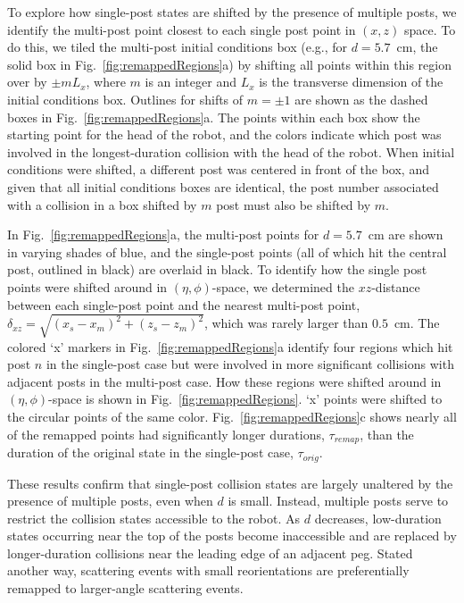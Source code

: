 \documentclass[aps,pre,twocolumn,superscriptaddress]{revtex4-1}
\begin{document}
To explore how single-post states are shifted by the presence of multiple posts, we identify the multi-post point closest to each single post point in $(x,z)$ space. To do this, we tiled the multi-post initial conditions box (e.g., for $d = 5.7$~cm, the solid box in Fig.~\ref{fig:remappedRegions}a) by shifting all points within this region over by $\pm m L_x$, where $m$ is an integer and $L_x$ is the transverse dimension of the initial conditions box. Outlines for shifts of $m = \pm 1$ are shown as the dashed boxes in Fig.~\ref{fig:remappedRegions}a. The points within each box show the starting point for the head of the robot, and the colors indicate which post was involved in the longest-duration collision with the head of the robot. When initial conditions were shifted, a different post was centered in front of the box, and given that all initial conditions boxes are identical, the post number associated with a collision in a box shifted by $m$ post must also be shifted by $m$.  

In Fig.~\ref{fig:remappedRegions}a, the multi-post points for $d = 5.7$~cm are shown in varying shades of blue, and the single-post points (all of which hit the central post, outlined in black) are overlaid in black. To identify how the single post points were shifted around in $(\eta,\phi)$-space, we determined the $xz$-distance between each single-post point and the nearest multi-post point, $\delta_{xz} = \sqrt{(x_s-x_m)^2+(z_s-z_m)^2}$, which was rarely larger than $0.5$~cm. The colored `x' markers in Fig.~\ref{fig:remappedRegions}a identify four regions which hit post $n$ in the single-post case but were involved in more significant collisions with adjacent posts in the multi-post case. How these regions were shifted around in $(\eta,\phi)$-space is shown in Fig.~\ref{fig:remappedRegions}. `x' points were shifted to the circular points of the same color. Fig.~\ref{fig:remappedRegions}c shows nearly all of the remapped points had significantly longer durations, $\tau_{remap}$, than the duration of the original state in the single-post case, $\tau_{orig}$.

These results confirm that single-post collision states are largely unaltered by the presence of multiple posts, even when $d$ is small. Instead, multiple posts serve to restrict the collision states accessible to the robot. As $d$ decreases, low-duration states occurring near the top of the posts become inaccessible and are replaced by longer-duration collisions near the leading edge of an adjacent peg. Stated another way, scattering events with small reorientations are preferentially remapped to larger-angle scattering events.
\end{document}
